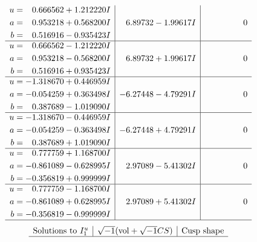 \documentclass[1p]{elsarticle_modified}
\theoremstyle{definition}
\newcommand{\I}{\sqrt{-1}}
\begin{document}
$$\begin{array}{c|c|c}
\begin{aligned}
u &= \phantom{-}0.666562 + 1.212220 I \\
a &= \phantom{-}0.953218 + 0.568200 I \\
b &= \phantom{-}0.516916 - 0.935423 I\end{aligned}
 & \phantom{-}6.89732 - 1.99617 I & \phantom{-0.000000 } 0 \\ \hline\begin{aligned}
u &= \phantom{-}0.666562 - 1.212220 I \\
a &= \phantom{-}0.953218 - 0.568200 I \\
b &= \phantom{-}0.516916 + 0.935423 I\end{aligned}
 & \phantom{-}6.89732 + 1.99617 I & \phantom{-0.000000 } 0 \\ \hline\begin{aligned}
u &= -1.318670 + 0.446959 I \\
a &= -0.054259 + 0.363498 I \\
b &= \phantom{-}0.387689 - 1.019090 I\end{aligned}
 & -6.27448 - 4.79291 I & \phantom{-0.000000 } 0 \\ \hline\begin{aligned}
u &= -1.318670 - 0.446959 I \\
a &= -0.054259 - 0.363498 I \\
b &= \phantom{-}0.387689 + 1.019090 I\end{aligned}
 & -6.27448 + 4.79291 I & \phantom{-0.000000 } 0 \\ \hline\begin{aligned}
u &= \phantom{-}0.777759 + 1.168700 I \\
a &= -0.861089 - 0.628995 I \\
b &= -0.356819 + 0.999999 I\end{aligned}
 & \phantom{-}2.97089 - 5.41302 I & \phantom{-0.000000 } 0 \\ \hline\begin{aligned}
u &= \phantom{-}0.777759 - 1.168700 I \\
a &= -0.861089 + 0.628995 I \\
b &= -0.356819 - 0.999999 I\end{aligned}
 & \phantom{-}2.97089 + 5.41302 I & \phantom{-0.000000 } 0\\
 \hline 
 \end{array}$$\newpage$$\begin{array}{c|c|c}  
\text{Solutions to }I^u_{1}& \I (\text{vol} + \sqrt{-1}CS) & \text{Cusp shape}\\
 \hline 

\end{array}$$
\end{document}
